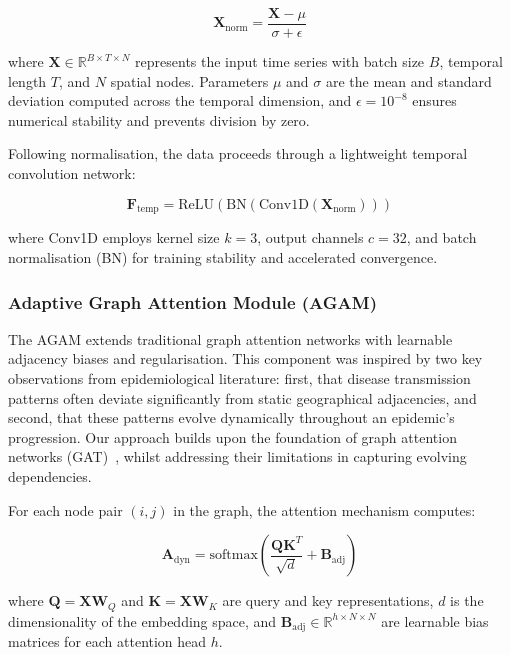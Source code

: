 \documentclass[lettersize, journal]{IEEEtran}
\begin{document}
\begin{equation}
\mathbf{X}_{\text{norm}} = \frac{\mathbf{X} - \mu}{\sigma + \epsilon}
\end{equation}

where $\mathbf{X} \in \mathbb{R}^{B \times T \times N}$ represents the input time series with batch size $B$, temporal length $T$, and $N$ spatial nodes. Parameters $\mu$ and $\sigma$ are the mean and standard deviation computed across the temporal dimension, and $\epsilon = 10^{-8}$ ensures numerical stability and prevents division by zero.

Following normalisation, the data proceeds through a lightweight temporal convolution network:

\begin{equation}
\mathbf{F}_{\text{temp}} = \text{ReLU}(\text{BN}(\text{Conv1D}(\mathbf{X}_{\text{norm}})))
\end{equation}

where Conv1D employs kernel size $k=3$, output channels $c=32$, and batch normalisation (BN) for training stability and accelerated convergence.

\subsubsection{Adaptive Graph Attention Module (AGAM)}
The AGAM extends traditional graph attention networks with learnable adjacency biases and regularisation. This component was inspired by two key observations from epidemiological literature: first, that disease transmission patterns often deviate significantly from static geographical adjacencies, and second, that these patterns evolve dynamically throughout an epidemic's progression. Our approach builds upon the foundation of graph attention networks (GAT)~\cite{gat}, whilst addressing their limitations in capturing evolving dependencies.

For each node pair $(i,j)$ in the graph, the attention mechanism computes:

\begin{equation}
\mathbf{A}_{\text{dyn}} = \text{softmax}\left(\frac{\mathbf{Q}\mathbf{K}^T}{\sqrt{d}} + \mathbf{B}_{\text{adj}}\right)
\end{equation}

where $\mathbf{Q} = \mathbf{X}\mathbf{W}_Q$ and $\mathbf{K} = \mathbf{X}\mathbf{W}_K$ are query and key representations, $d$ is the dimensionality of the embedding space, and $\mathbf{B}_{\text{adj}} \in \mathbb{R}^{h \times N \times N}$ are learnable bias matrices for each attention head $h$.
\end{document}
